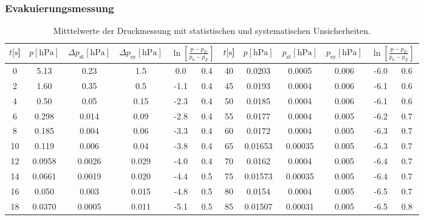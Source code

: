\subsubsection{Evakuierungsmessung}
\begin{table}[H]
    \centering
      \caption{Mitttelwerte der Druckmessung mit statistischen und systematischen Unsicherheiten.}
      \label{tab:Turbo_Evak}
      \begin{tabular}{
        S[table-format=2.0] S[table-format=1.5] S[table-format=1.5] S[table-format=1.4] S @{${}\pm{}$} S | 
        S[table-format=3.0] S[table-format=1.5] S[table-format=1.5] S[table-format=1.3] S @{${}\pm{}$} S
        }
        \toprule
        {$t [\si{\second}$]} & 
        {$p [\si{\hecto\pascal}]$} & 
        {$\Delta p_\text{st} [\si{\hecto\pascal}]$} & 
        {$\Delta p_\text{sy} [\si{\hecto\pascal}]$} & 
         &
        {$t [\si{\second}$]} & 
        {$p [\si{\hecto\pascal}]$} & 
        {$p_\text{st} [\si{\hecto\pascal}]$} & 
        {$p_\text{sy} [\si{\hecto\pascal}]$} &
         \\
           & 5.13    & 0.23    & 1.5   &  0.0 & 0.4 & 40  & 0.0203  & 0.0005  & 0.006 & -6.0 & 0.6\\
        2   & 1.60    & 0.35    & 0.5   & -1.1 & 0.4 & 45  & 0.0193  & 0.0004  & 0.006 & -6.1 & 0.6\\
        4   & 0.50    & 0.05    & 0.15  & -2.3 & 0.4 & 50  & 0.0185  & 0.0004  & 0.006 & -6.1 & 0.6\\
        6   & 0.298   & 0.014   & 0.09  & -2.8 & 0.4 & 55  & 0.0177  & 0.0004  & 0.005 & -6.2 & 0.7\\
        8   & 0.185   & 0.004   & 0.06  & -3.3 & 0.4 & 60  & 0.0172  & 0.0004  & 0.005 & -6.3 & 0.7\\
        10  & 0.119   & 0.006   & 0.04  & -3.8 & 0.4 & 65  & 0.01653 & 0.00035 & 0.005 & -6.3 & 0.7\\
        12  & 0.0958  & 0.0026  & 0.029 & -4.0 & 0.4 & 70  & 0.0162  & 0.0004  & 0.005 & -6.4 & 0.7\\
        14  & 0.0661  & 0.0019  & 0.020 & -4.4 & 0.5 & 75  & 0.01573 & 0.00035 & 0.005 & -6.4 & 0.7\\
        16  & 0.050   & 0.003   & 0.015 & -4.8 & 0.5 & 80  & 0.0154  & 0.0004  & 0.005 & -6.5 & 0.7\\
        18  & 0.0370  & 0.0005  & 0.011 & -5.1 & 0.5 & 85  & 0.01507 & 0.00031 & 0.005 & -6.5 & 0.8\\

\end{tabular}
\end{table}
